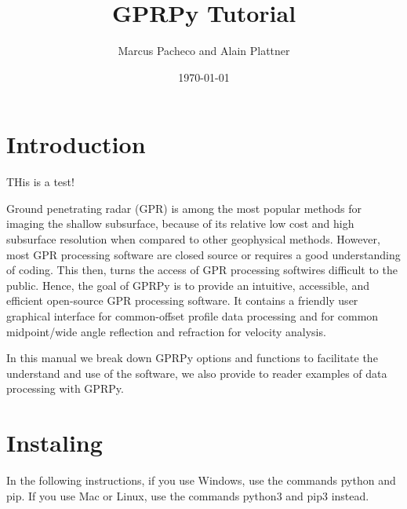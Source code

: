 \documentclass[12pt]{article}
\title{GPRPy Tutorial}
\author{Marcus Pacheco and Alain Plattner}
\date{\today}
\begin{document}
\maketitle
\tableofcontents

\section{Introduction}\label{Introduction}


\COMON THis is a test! \COMOFF

	Ground penetrating radar (GPR) is among the most popular methods for imaging the shallow subsurface, because of its relative low cost and high subsurface resolution when compared to other geophysical methods. However, most GPR processing software are closed source or requires a good understanding of coding. This then, turns the access of GPR processing softwires difficult to the public. Hence, the goal of GPRPy is to provide an intuitive, accessible, and efficient open-source GPR processing software. It contains a friendly user graphical interface for common-offset profile data processing and for common midpoint/wide angle reflection and refraction for velocity analysis.
	
	In this manual we break down GPRPy options and functions to facilitate the understand and use of the software, we also provide to reader examples of data processing with GPRPy.



\section{Instaling}\label{Instaling}

In the following instructions, if you use Windows, use the commands python and pip. If you use Mac or Linux, use the commands python3 and pip3 instead.
\end{document}
